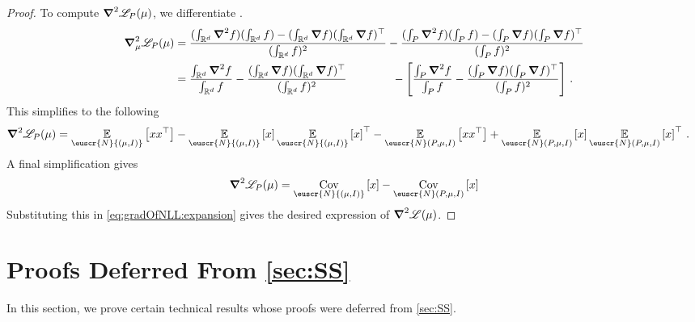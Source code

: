 \documentclass[11pt,letterpaper]{article}
\theoremstyle{plain}
\theoremstyle{definition}
\theoremstyle{remark}
\newcommand{\inparen}[1]{\ensuremath{\left(#1\right)}}
\newcommand{\insquare}[1]{\ensuremath{\left[#1\right]}}
\newcommand{\R}{\mathbb{R}}
\newcommand{\E}{\operatornamewithlimits{\mathbb{E}}}
\newcommand{\Ex}{\E}
\newcommand{\cov}{\ensuremath{\operatornamewithlimits{\rm Cov}}}
\newcommand{\customcal}[1]{\euscr{#1}}
\newcommand{\cN}{\customcal{N}}
\newcommand{\negLL}{\ensuremath{\mathscr{L}}}
\newcommand{\normal}[2]{\cN{\inparen{#1,#2}}}
\newcommand{\truncatedNormal}[3]{\cN\inparen{#1,#2,#3}}
\begin{document}
{{{\begin{proof}
        To compute $\grad^2 \negLL_{P}(\mu)$,
        we differentiate .
        \begin{align*}
            \grad_{\mu}^2 \negLL_P(\mu)
            &= \frac{(\int_{\R^d} \grad^2 f)(\int_{\R^d} f) - (\int_{\R^d} \grad f)(\int_{\R^d} \grad f)^\top}{(\int_{\R^d} f)^2}
            - \frac{(\int_{P} \grad^2 f)(\int_{P} f) - (\int_{P} \grad f)(\int_{P} \grad f)^\top}{(\int_{P} f)^2} \\
            &= \frac{\int_{\R^d} \grad^2 f}{\int_{\R^d} f} - \frac{(\int_{\R^d} \grad f)(\int_{\R^d} \grad f)^\top}{(\int_{\R^d} f)^2}
            \qquad\quad~~~ - \left[ \frac{\int_P \grad^2 f}{\int_P f} - \frac{(\int_P \grad f)(\int_P \grad f)^\top}{(\int_P f)^2} \right]\,.
        \end{align*}
        This simplifies to the following 
        \begin{align*}
            \grad^2 \negLL_{P}(\mu) 
            &= 
            \Ex_{\normal{\mu}{I}}\insquare{
                    x
                    x^\top
            }
            - \Ex_{\normal{\mu}{I}}\insquare{
                    x
            }
            \Ex_{\normal{\mu}{I}}\insquare{
                    x
            }^\top
            - 
            \Ex_{\truncatedNormal{P}{\mu}{I}}\insquare{
                    x
                    x^\top
            }
            + \Ex_{\truncatedNormal{P}{\mu}{I}}\insquare{
                    x
            }
            \Ex_{\truncatedNormal{P}{\mu}{I}}\insquare{
                    x
            }^\top 
            \,.
        \end{align*}
        A final simplification gives 
        \[
            \grad^2 \negLL_{P}(\mu) 
            =
            \cov_{\normal{\mu}{I}}\insquare{
                    x
            }
            -
            \cov_{\truncatedNormal{P}{\mu}{I}}\insquare{
                    x
            }
        \]
        Substituting this in \cref{eq:gradOfNLL:expansion} gives the desired expression of $\grad^2 \negLL(\mu)$.
    \end{proof}

    
\section{Proofs Deferred From \texorpdfstring{\cref{sec:SS}}{Section 5}}
    In this section, we prove certain technical results whose proofs were deferred from \cref{sec:SS}.
}}}
\end{document}

